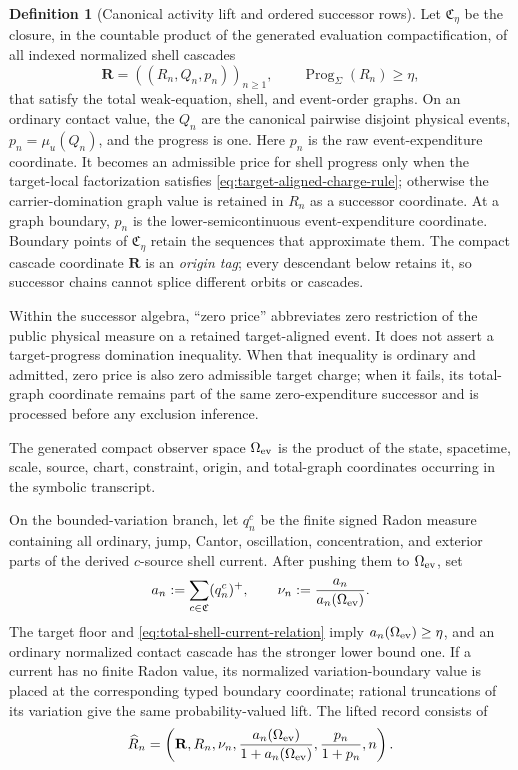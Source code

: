 \documentclass[11pt]{article}
\numberwithin{section}{part}
\theoremstyle{plain}
\theoremstyle{definition}
\newtheorem{definition}[definition]{Definition}
\theoremstyle{remark}
\newcommand{\Channels}{\mathfrak C}
\begin{document}
\begin{definition}[Canonical activity lift and ordered successor rows]
\label{def:ordered-continuum-successors}
Let \(\mathfrak C_\eta\) be the closure, in the countable product of the
generated evaluation compactification, of all indexed normalized shell
cascades
\[
 \mathbf R=((R_n,Q_n,p_n))_{n\ge1},
 \qquad \operatorname{Prog}_\Sigma(R_n)\ge\eta,
\]
that satisfy the total weak-equation, shell, and event-order graphs.  On an
ordinary contact value, the \(Q_n\) are the canonical pairwise disjoint
physical events, \(p_n=\mu_u(Q_n)\), and the progress is one.  Here \(p_n\)
is the raw event-expenditure coordinate.  It becomes an admissible price for
shell progress only when the target-local factorization satisfies
\eqref{eq:target-aligned-charge-rule}; otherwise the carrier-domination graph
value is retained in \(R_n\) as a successor coordinate.  At a graph
boundary, \(p_n\) is the lower-semicontinuous event-expenditure coordinate.
Boundary points of
\(\mathfrak C_\eta\) retain the sequences that approximate them.  The compact
cascade coordinate \(\mathbf R\) is an \emph{origin tag}; every descendant
below retains it, so successor chains cannot splice different orbits or
cascades.

Within the successor algebra, ``zero price'' abbreviates zero restriction of
the public physical measure on a retained target-aligned event.  It does not
assert a target-progress domination inequality.  When that inequality is
ordinary and admitted, zero price is also zero admissible target charge; when
it fails, its total-graph coordinate remains part of the same zero-expenditure
successor and is processed before any exclusion inference.

The generated compact observer space \(\Omega_{\rm ev}\) is the product of
the state, spacetime, scale, source, chart, constraint, origin, and total-graph
coordinates occurring in the symbolic transcript.

On the bounded-variation branch, let \(q_n^c\) be the finite signed Radon
measure containing all ordinary, jump, Cantor, oscillation, concentration,
and exterior parts of the derived \(c\)-source shell current.  After pushing
them to \(\Omega_{\rm ev}\), set
\begin{equation}
 \label{eq:canonical-activity-measure}
 a_n:=\sum_{c\in\Channels}(q_n^c)^+,
 \qquad
 \nu_n:=\frac{a_n}{a_n(\Omega_{\rm ev})}.
\end{equation}
The target floor and \eqref{eq:total-shell-current-relation} imply
\(a_n(\Omega_{\rm ev})\ge\eta\), and an ordinary normalized contact cascade
has the stronger lower bound one.  If a current has no finite Radon value, its
normalized variation-boundary value is placed at the corresponding typed
boundary coordinate; rational truncations of its variation give the same
probability-valued lift.
The lifted record consists of
\begin{equation}
 \label{eq:canonical-activity-lift}
 \widehat R_n=
 \left(\mathbf R,R_n,\nu_n,
       \frac{a_n(\Omega_{\rm ev})}{1+a_n(\Omega_{\rm ev})},
       \frac{p_n}{1+p_n},n\right).
\end{equation}


\end{definition}
\end{document}
